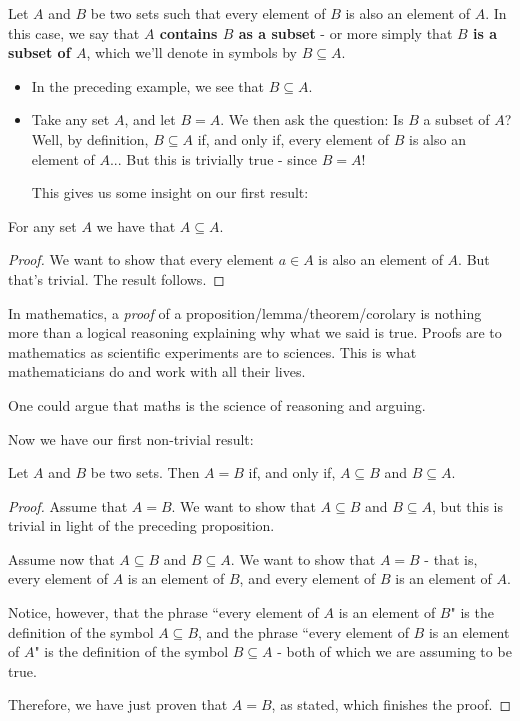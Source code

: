 \begin{df}
	Let $A$ and $B$ be two sets such that every element of $B$ is also an element of $A$. In this case, we say that \textbf{$A$ contains $B$ as a subset} - or more simply that \textbf{$B$ is a subset of $A$}, which we'll denote in symbols by $B\subseteq A$.
\end{df}

\begin{ex}
	\begin{itemize}
		\item In the preceding example, we see that $B\subseteq A$.
		\item Take any set $A$, and let $B=A$. We then ask the question: Is $B$ a subset of $A$? Well, by definition, $B\subseteq A$ if, and only if, every element of $B$ is also an element of $A$... But this is trivially true - since $B=A$!
		
		This gives us some insight on our first result:
	\end{itemize}
\end{ex}

\begin{prop}
	For any set $A$ we have that $A\subseteq A$.
\end{prop}
\begin{proof}
	We want to show that every element $a\in A$ is also an element of $A$. But that's trivial. The result follows.
\end{proof}

\begin{rmk}
	In mathematics, a \emph{proof} of a proposition/lemma/theorem/corolary is nothing more than a logical reasoning explaining why what we said is true. Proofs are to mathematics as scientific experiments are to sciences. This is what mathematicians do and work with all their lives.
	
	One could argue that maths is the science of reasoning and arguing.
\end{rmk}

Now we have our first non-trivial result:

\begin{prop}
	Let $A$ and $B$ be two sets. Then $A=B$ if, and only if, $A\subseteq B$ and $B\subseteq A$.
\end{prop}
\begin{proof}
	Assume that $A=B$. We want to show that $A\subseteq B$ and $B\subseteq A$, but this is trivial in light of the preceding proposition.
	
	\bigskip
	Assume now that $A\subseteq B$ and $B\subseteq A$. We want to show that $A=B$ - that is, every element of $A$ is an element of $B$, and every element of $B$ is an element of $A$.
	
	Notice, however, that the phrase ``every element of $A$ is an element of $B$" is the definition of the symbol $A\subseteq B$, and the phrase ``every element of $B$ is an element of $A$" is the definition of the symbol $B\subseteq A$ - both of which we are assuming to be true.
	
	Therefore, we have just proven that $A=B$, as stated, which finishes the proof.
\end{proof}

